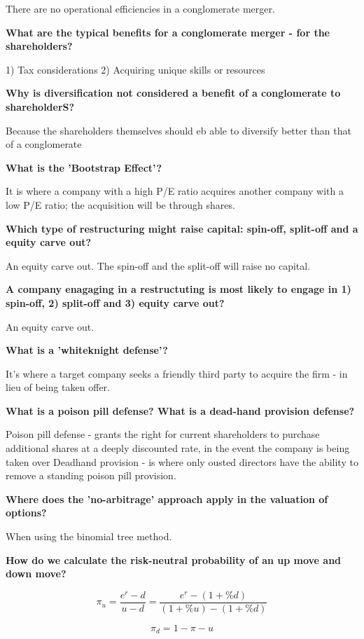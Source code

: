 \documentclass[12pt]{article}
\begin{document}
\begin{framed}
	There are no operational efficiencies in a conglomerate merger.
	
	\textbf{What are the typical benefits for a conglomerate merger - for the shareholders?}
	
	1) Tax considerations
	2) Acquiring unique skills or resources
	
	\textbf{Why is diversification not considered a benefit of a conglomerate to shareholderS?}
	
	Because the shareholders themselves should eb able to diversify better than that of a conglomerate
	
	\textbf{What is the 'Bootstrap Effect'?}
	
	It is where a company with a high P/E ratio acquires another company with a low P/E ratio; the acquisition will be through shares. 
	
	\textbf{Which type of restructuring might raise  capital: spin-off, split-off and a equity carve out?}
	
	An equity carve out. The spin-off and the split-off will raise no capital. 
	
	\textbf{A company enagaging in a restructuting is most likely to engage in 1) spin-off, 2) split-off and 3) equity carve out?}
	
	An equity carve out.
	
	\textbf{What is a 'whiteknight defense'?}
	
	It's where a target company seeks a friendly third party to acquire the firm - in lieu of being taken offer. 
	
	\textbf{What is a poison pill defense? What is a dead-hand provision defense?}
	
	Poison pill defense - grants the right for current shareholders to purchase additional shares at a deeply discounted rate, in the event the company is being taken over
	Deadhand provision - is where only ousted directors have the ability to remove a standing poison pill provision. 
	
	\textbf{Where does the 'no-arbitrage' approach apply in the valuation of options?}
	
	When using the binomial tree method. 
	
	\textbf{How do we calculate the risk-neutral probability of an up move and down move?}
	
	$$
	\pi_u = \dfrac{e^r - d}{u - d} = \dfrac{e^r - (1 + \%d)}{(1 + \%u) - (1 + \%d)} 
	$$
	
	$$
	\pi_d = 1 - \pi-u
	$$
	

\end{framed}
\end{document}
